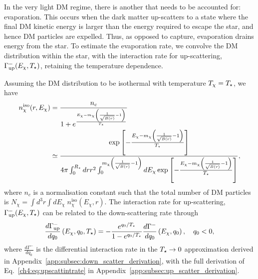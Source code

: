 In the very light DM regime, there is another that needs to be accounted for: evaporation. This occurs when the dark matter up-scatters to a state where the final DM kinetic energy is larger than the energy required to escape the star, and hence DM particles are expelled. Thus, as opposed to capture, evaporation drains energy from the star. 
To estimate the evaporation rate, we convolve the DM distribution within the star, with the interaction rate for up-scattering, $\Gamma^-_\mathrm{up}(E_\chi, T_\star)$, retaining the temperature dependence.

Assuming the DM distribution to be isothermal with temperature $T_\chi=T_\star$, we have 
\begin{align}
n_\chi^\mathrm{iso}(r,E_\chi) &= \frac{n_c}{1+e^{\frac{E_\chi-m_\chi\left(\frac{1}{\sqrt{B(r)}}-1\right)}{T_\star}}} \\
& \simeq \frac{ \exp\left[-\frac{E_\chi-m_\chi\left(\frac{1}{\sqrt{B(r)}}-1\right)}{T_\star}\right]}{4\pi \int_0^{R_\star} dr r^2  \int_0^{m_\chi\left(\frac{1}{\sqrt{B(r)}}-1\right)} dE_\chi \exp \left[{-\frac{E_\chi-m_\chi\left(\frac{1}{\sqrt{B(r)}}-1\right)}{T_\star}}\right]}, 
\end{align}
where $n_c$ is a normalisation constant such that the total number of DM particles is $N_\chi = \int d^3r\int dE_\chi\;n_\chi^\mathrm{iso}(E_\chi, r)$. The interaction rate for up-scattering, $\Gamma^-_\mathrm{up}(E_\chi, T_\star)$ can be related to the down-scattering rate through
\begin{equation}
\frac{d\Gamma^-_\mathrm{up}}{dq_0}\left(E_\chi, q_0,T_\star\right) = -\frac{e^{q_0/T_\star}}{1-e^{q_0/T_\star}} \dfrac{d\Gamma^-}{dq_0}\left(E_\chi, q_0\right),\quad q_0<0,
\label{ch4:eq:upscattintrate}
\end{equation}
where $\tfrac{d\Gamma^-}{dq_0}$ is the differential interaction rate in the $T_\star\rightarrow 0$ approximation derived in Appendix~\ref{app:subsec:down_scatter_derivation}, with the full derivation of Eq.~\ref{ch4:eq:upscattintrate} in Appendix~\ref{app:subsec:up_scatter_derivation}. 

